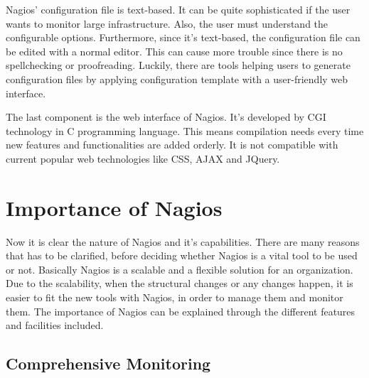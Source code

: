 \documentclass[9pt,twocolumn,twoside]{styles/osajnl}
\begin{document}
Nagios' configuration file is text-based. It can be quite sophisticated if the user wants to monitor large infrastructure. Also, the user must understand the configurable options. Furthermore, since it's text-based, the configuration file can be edited with a normal editor. This can cause more trouble since there is no spellchecking or proofreading. Luckily, there are tools helping users to generate configuration files by applying configuration template with a user-friendly web interface.

The last component is the web interface of Nagios. It's developed by CGI technology in C programming language. This means compilation needs every time new features and functionalities are added orderly. It is not compatible with current popular web technologies like CSS, AJAX and JQuery.

\section{Importance of Nagios}

Now it is clear the nature of Nagios and it's capabilities. There are many reasons that has to be clarified, before deciding whether Nagios is a vital tool to be used or not. Basically Nagios is a scalable and a flexible solution for an organization. Due to the scalability, when the structural changes or any changes happen, it is easier to fit the new tools with Nagios, in order to manage them and monitor them. The importance of Nagios can be explained through the different features and facilities included. 

\subsection{Comprehensive Monitoring}
\end{document}
